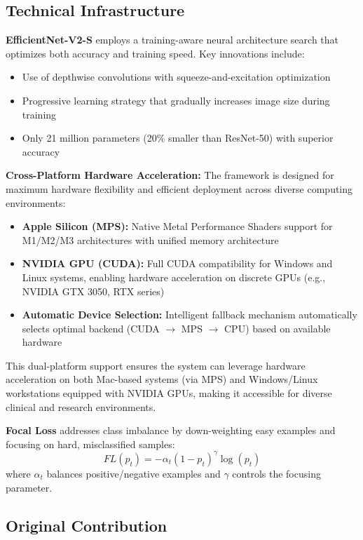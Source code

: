 \documentclass[12pt,a4paper]{article}
\begin{document}
\subsection{Technical Infrastructure}

\textbf{EfficientNet-V2-S} employs a training-aware neural architecture search that optimizes both accuracy and training speed. Key innovations include:
\begin{itemize}
    \item Use of depthwise convolutions with squeeze-and-excitation optimization
    \item Progressive learning strategy that gradually increases image size during training
    \item Only 21 million parameters (20\% smaller than ResNet-50) with superior accuracy
\end{itemize}

\textbf{Cross-Platform Hardware Acceleration:} The framework is designed for maximum hardware flexibility and efficient deployment across diverse computing environments:
\begin{itemize}
    \item \textbf{Apple Silicon (MPS):} Native Metal Performance Shaders support for M1/M2/M3 architectures with unified memory architecture
    \item \textbf{NVIDIA GPU (CUDA):} Full CUDA compatibility for Windows and Linux systems, enabling hardware acceleration on discrete GPUs (e.g., NVIDIA GTX 3050, RTX series)
    \item \textbf{Automatic Device Selection:} Intelligent fallback mechanism automatically selects optimal backend (CUDA $\rightarrow$ MPS $\rightarrow$ CPU) based on available hardware
\end{itemize}

This dual-platform support ensures the system can leverage hardware acceleration on both Mac-based systems (via MPS) and Windows/Linux workstations equipped with NVIDIA GPUs, making it accessible for diverse clinical and research environments.

\textbf{Focal Loss} addresses class imbalance by down-weighting easy examples and focusing on hard, misclassified samples:
\begin{equation}
    FL(p_t) = -\alpha_t (1 - p_t)^\gamma \log(p_t)
\end{equation}
where $\alpha_t$ balances positive/negative examples and $\gamma$ controls the focusing parameter.

\subsection{Original Contribution}
\end{document}

